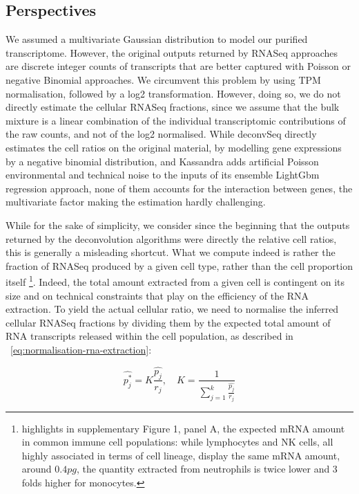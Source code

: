 \documentclass[long, final]{jobim}
\begin{document}
\subsection{Perspectives}
\label{subsec:perspectives}

We assumed a multivariate Gaussian distribution to model our purified transcriptome. However, the original outputs returned by RNASeq approaches are discrete integer counts of transcripts that are better captured with Poisson or negative Binomial approaches. We circumvent this problem by using TPM normalisation, followed by a log2 transformation. However, doing so, we do not directly estimate the cellular RNASeq fractions, since we assume that the bulk mixture is a linear combination of the individual transcriptomic contributions of the raw counts, and not of the log2 normalised. While deconvSeq \cite{du_etal19} directly estimates the cell ratios on the original material, by modelling gene expressions by a negative binomial distribution, and Kassandra \cite{zaitsev_etal22} adds artificial Poisson environmental and technical noise to the inputs of its ensemble LightGbm regression approach, none of them accounts for the interaction between genes, the multivariate factor making the estimation hardly challenging. 


While for the sake of simplicity, we consider since the beginning that the outputs returned by the deconvolution algorithms were directly the relative cell ratios, this is generally a misleading shortcut. What we compute indeed is rather the fraction of RNASeq produced by a given cell type, rather than the cell proportion itself \footnote{\cite{racle_etal17}highlights in supplementary Figure 1, panel A, the expected mRNA amount in common immune cell populations: while lymphocytes and NK cells, all highly associated in terms of cell lineage, display the same mRNA amount, around $0.4 \unit{pg}$, the quantity extracted from neutrophils is twice lower and 3 folds higher for monocytes.}. Indeed, the total amount extracted from a given cell is contingent on its size and on technical constraints that play on the efficiency of the RNA extraction. To yield the actual cellular ratio, we need to normalise the inferred cellular RNASeq fractions by dividing them by the expected total amount of RNA transcripts released within the cell population, as described in \equationname ~\ref{eq:normalisation-rna-extraction}:

\begin{equation}
    \hat{p^*_j} = K \frac{\hat{p_j}}{r_j}, \quad K= \frac{1}{\sum_{j=1}^k \frac{\hat{p_j}}{r_j}}
    \label{eq:normalisation-rna-extraction}
\end{equation}
\end{document}
